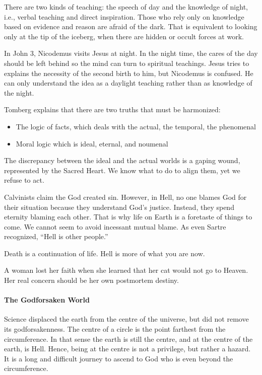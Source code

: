 There are two kinds of teaching: the speech of day and the knowledge of night, i.e., verbal teaching and direct inspiration. Those who rely only on knowledge based on evidence and reason are afraid of the dark. That is equivalent to looking only at the tip of the iceberg, when there are hidden or occult forces at work.

In John 3, Nicodemus visits Jesus at night. In the night time, the cares of the day should be left behind so the mind can turn to spiritual teachings. Jesus tries to explains the necessity of the second birth to him, but Nicodemus is confused. He can only understand the idea as a daylight teaching rather than as knowledge of the night.

Tomberg explains that there are two truths that must be harmonized:

\begin{itemize}


\item The logic of facts, which deals with the actual, the temporal, the phenomenal

\item Moral logic which is ideal, eternal, and noumenal
\end{itemize}


The discrepancy between the ideal and the actual worlds is a gaping wound, represented by the Sacred Heart. We know what to do to align them, yet we refuse to act.

Calvinists claim the God created sin. However, in Hell, no one blames God for their situation because they understand God's justice. Instead, they spend eternity blaming each other. That is why life on Earth is a foretaste of things to come. We cannot seem to avoid incessant mutual blame. As even Sartre recognized, ``Hell is other people.''

Death is a continuation of life. Hell is more of what you are now.

A woman lost her faith when she learned that her cat would not go to Heaven. Her real concern should be her own postmortem destiny.

\paragraph{The Godforsaken World}


Science displaced the earth from the centre of the universe, but did not remove its godforsakenness. The centre of a circle is the point farthest from the circumference. In that sense the earth is still the centre, and at the centre of the earth, is Hell. Hence, being at the centre is not a privilege, but rather a hazard. It is a long and difficult journey to ascend to God who is even beyond the circumference.

